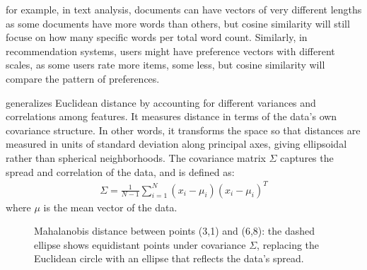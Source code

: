  for example, in text analysis, documents can have vectors of very different lengths 
as some documents have more words than others, but cosine similarity will still focuse on how many specific words per total word count.
Similarly, in recommendation systems, users might have preference vectors with different scales, as some users rate more items, some less, 
but cosine similarity will compare the pattern of preferences.
 

\vspace{2.5em}
 generalizes Euclidean distance by accounting for different variances and correlations among features. 
It measures distance in terms of the data's own covariance structure. In other words, it transforms the space so that 
distances are measured in units of standard deviation along principal axes, giving ellipsoidal rather than spherical neighborhoods.
The covariance matrix $\Sigma$ captures the spread and correlation of the data, and is defined as:
\begin{align*}
    \Sigma = \frac{1}{N-1} \sum_{i=1}^{N} (x_i - \mu_i)(x_i - \mu_i)^T
\end{align*}
where $\mu$ is the mean vector of the data. 

\begin{figure}
\centering
{}
\caption{Mahalanobis distance between points (3,1) and (6,8): the dashed ellipse shows equidistant points under covariance $\Sigma$, replacing the Euclidean circle with an ellipse that reflects the data's spread.}
\label{fig:six_points_mahalanobis}
\end{figure}

